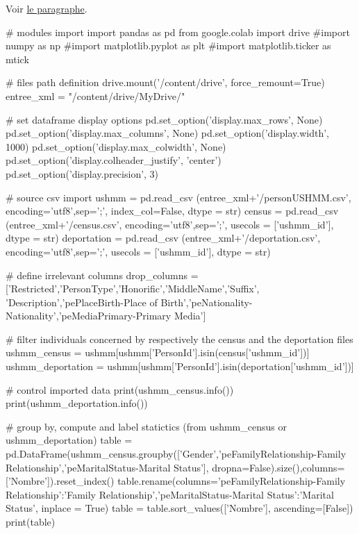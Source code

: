 \documentclass[a4paper,12pt,twoside]{book}
\begin{document}
		    Voir \hyperref[tab7]{le paragraphe}.
		    \label{analyse4}
		
		    \begin{python}
# modules import
import pandas as pd
from google.colab import drive
#import numpy as np
#import matplotlib.pyplot as plt
#import matplotlib.ticker as mtick

# files path definition
drive.mount('/content/drive', force_remount=True)
entree_xml = "/content/drive/MyDrive/"

# set dataframe display options
pd.set_option('display.max_rows', None)
pd.set_option('display.max_columns', None)
pd.set_option('display.width', 1000)
pd.set_option('display.max_colwidth', None)
pd.set_option('display.colheader_justify', 'center')
pd.set_option('display.precision', 3)

# source csv import
ushmm = pd.read_csv (entree_xml+'/personUSHMM.csv', encoding='utf8',sep=';', index_col=False, dtype = str)
census = pd.read_csv (entree_xml+'/census.csv', encoding='utf8',sep=';', usecols = ['ushmm_id'],  dtype = str)
deportation = pd.read_csv (entree_xml+'/deportation.csv', encoding='utf8',sep=';', usecols = ['ushmm_id'], dtype = str)

# define irrelevant columns
drop_columns = ['Restricted','PersonType','Honorific','MiddleName','Suffix', 'Description','pePlaceBirth-Place of Birth','peNationality-Nationality','peMediaPrimary-Primary Media']

# filter individuals concerned by respectively the census and the deportation files
ushmm_census = ushmm[ushmm['PersonId'].isin(census['ushmm_id'])]
ushmm_deportation = ushmm[ushmm['PersonId'].isin(deportation['ushmm_id'])]

# control imported data
print(ushmm_census.info())
print(ushmm_deportation.info())

# group by, compute and label statictics (from ushmm_census or ushmm_deportation)
table = pd.DataFrame(ushmm_census.groupby(['Gender','peFamilyRelationship-Family Relationship','peMaritalStatus-Marital Status'], dropna=False).size(),columns=['Nombre']).reset_index()
table.rename(columns={'peFamilyRelationship-Family Relationship':'Family Relationship','peMaritalStatus-Marital Status':'Marital Status'}, inplace = True)
table = table.sort_values(['Nombre'], ascending=[False])
print(table)		
		
            \end{python}
\end{document}
